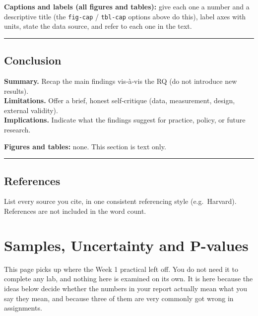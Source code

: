 \documentclass[
  letterpaper,
  DIV=11,
  numbers=noendperiod]{scrreprt}
\newcounter{none} %
\begin{document}
\textbf{Captions and labels (all figures and tables):} give each one a
number and a descriptive title (the \texttt{fig-cap} / \texttt{tbl-cap}
options above do this), label axes with units, state the data source,
and refer to each one in the text.

\begin{center}\rule{0.5\linewidth}{0.5pt}\end{center}

\section*{Conclusion}\label{conclusion}


\textbf{Summary.} Recap the main findings vis‑à‑vis the RQ (do not
introduce new results).\\
\textbf{Limitations.} Offer a brief, honest self‑critique (data,
measurement, design, external validity).\\
\textbf{Implications.} Indicate what the findings suggest for practice,
policy, or future research.

\textbf{Figures and tables:} none. This section is text only.

\begin{center}\rule{0.5\linewidth}{0.5pt}\end{center}

\section*{References}\label{references}


List every source you cite, in one consistent referencing style
(e.g.~Harvard). References are not included in the word count.


\chapter*{Samples, Uncertainty and
P-values}\label{samples-uncertainty-and-p-values}


This page picks up where the Week 1 practical left off. You do not need
it to complete any lab, and nothing here is examined on its own. It is
here because the ideas below decide whether the numbers in your report
actually mean what you say they mean, and because three of them are very
commonly got wrong in assignments.
\end{document}
